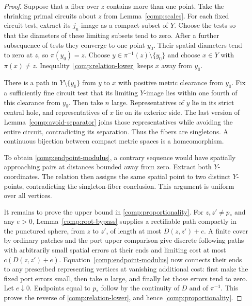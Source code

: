 \begin{proof}
Suppose that a fiber over $z$ contains more than one point.  Take
the shrinking primal circuits about $z$ from
Lemma~\ref{comp:scales}.  For each fixed circuit test, extract its
$j_n$-image as a compact subset of $Y$.  Choose the tests so that
the diameters of these limiting subsets tend to zero.  After a
further subsequence of tests they converge to one point $y_0$.
Their spatial diameters tend to zero at $z$, so $\pi(y_0)=z$.
Choose $y\in\pi^{-1}(z)\setminus\{y_0\}$ and choose $x\in Y$
with $\pi(x)\ne z$.  Inequality~\eqref{comp:relation-lower} keeps
$x$ away from $y_0$.

There is a path in $Y\setminus\{y_0\}$ from $y$ to $x$ with
positive metric clearance from $y_0$.  Fix a sufficiently fine
circuit test that its limiting $Y$-image lies within one fourth of
this clearance from $y_0$.  Then take $n$ large.  Representatives
of $y$ lie in its strict central hole, and representatives of $x$
lie on its exterior side.  The last version of
Lemma~\ref{comp:avoid-separator} joins those representatives while
avoiding the entire circuit, contradicting its separation.
Thus the fibers are singletons.  A continuous bijection between
compact metric spaces is a homeomorphism.

To obtain \eqref{comp:endpoint-modulus}, a contrary sequence would
have spatially approaching pairs at distances bounded away from
zero.  Extract both $Y$-coordinates.  The relation then assigns
the same spatial point to two distinct $Y$-points, contradicting
the singleton-fiber conclusion.  This argument is uniform over
all vertices.

It remains to prove the upper bound in
\eqref{comp:proportionality}.  For $z,z'\ne p_*$ and any $e>0$,
Lemma~\ref{comp:root-bypass} supplies a rectifiable path compactly
in the punctured sphere, from $z$ to $z'$, of length at most
$D(z,z')+e$.  A finite cover by ordinary patches and the port upper
comparison give discrete following paths with arbitrarily small
spatial errors at their ends and limiting cost at most
$c(D(z,z')+e)$.  Equation~\eqref{comp:endpoint-modulus} now connects
their ends to any prescribed representing vertices at vanishing
additional cost: first make the fixed port errors small, then
take $n$ large, and finally let those errors tend to zero.
Let $e\downarrow0$.  Endpoints equal to $p_*$ follow by the
continuity of $D$ and of $\pi^{-1}$.  This proves the reverse of
\eqref{comp:relation-lower}, and hence
\eqref{comp:proportionality}.
\end{proof}

